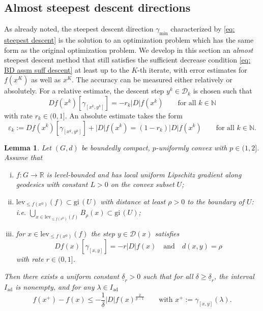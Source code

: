 \documentclass{article}
\theoremstyle{plain}\newtheorem{theorem}{Theorem}[section]
\theoremstyle{plain}\newtheorem{definition}[theorem]{Definition}
\theoremstyle{plain}\newtheorem{lemma}[theorem]{Lemma}
\theoremstyle{definition}\newtheorem{remark}[theorem]{Remark}
\theoremstyle{definition}\newtheorem{example}[theorem]{Example}
\theoremstyle{plain}\newtheorem{proposition}[theorem]{Proposition}
\theoremstyle{plain}\newtheorem{inference}[theorem]{Inference}
\theoremstyle{plain}\newtheorem{corollary}[theorem]{Corollary}
\theoremstyle{plain}\newtheorem{assumption}[theorem]{Assumption}
\newcommand{\bbN}{\mathbb{N}}
\begin{document}
\subsection{Almost steepest descent directions}\label{s:inexact}
As already noted, the steepest descent direction $\gamma_{\min}$ characterized by \eqref{eq: steepest descent} is the solution to an optimization problem which has the same form as the original optimization problem. We develop in this section an {\em almost} steepest descent method that still satisfies the sufficient decrease condition \eqref{eq: BD assm suff descent} at least up to the $K$-th iterate, with error estimates for $f(x^K)$ as well as $x^K$. The accuracy can be measured either relatively or absolutely.  For a relative estimate, the descent step $y^k\in\mathcal{D}_k$ is chosen such that
\begin{equation}\label{eq: rel error}
    Df(x^k)[\gamma_{[x^k,y^k]}]=-r_k|D|f(x^k) \qquad\text{for all}\,\,k\in\bbN
\end{equation}
with rate $r_k\in(0,1]$. An absolute estimate takes the form
\begin{equation}\label{eq: abs error}
    \varepsilon_k:=Df(x^k)[\gamma_{[x^k,y^k]}]+|D|f(x^k)=(1-r_k)|D|f(x^k) \qquad\text{for all}\,\,k\in\bbN.
\end{equation}
\begin{lemma}\label{lm: ID method 1}
    Let $(G,d)$ be boundedly compact, $p$-uniformly convex with $p\in(1,2]$. Assume that
    \begin{enumerate}[(i)]
        \item $f:G\to\mathbb{R}$ is level-bounded and has local uniform Lipschitz gradient along geodesics with constant $L>0$ on the convex subset $U$;
        \item $\mathrm{lev}_{\leq f(x^0)}(f)\subset \mathrm{gi}\,(U)$ with distance at least $\rho>0$ to the boundary of $U$: i.e. $\bigcup_{x\in \mathrm{lev}_{\leq f(x^0)}(f)} B_\rho(x)\subset \mathrm{gi}\,(U)$;
        \item for $x\in\mathrm{lev}_{\leq f(x^0)}(f)$ the step $y\in\mathcal{D}(x)$ satisfies
        \begin{equation}\label{eq: ID method y^k}
            Df(x)[\gamma_{[x,y]}]=-r|D|f(x)\quad\text{and}\quad d(x,y)=\rho
        \end{equation}
        with rate $r\in(0,1]$.
    \end{enumerate}
    Then there exists a uniform constant $\underline{\delta}_r>0$ such that for all $\delta\geq\underline{\delta}_r$, the interval $I_{\mathrm{ad}}$ is nonempty, and for any $\lambda\in I_{\mathrm{ad}}$
    $$
    f(x^+)-f(x)\leq-\frac{1}{\delta}|D|f(x)^{\frac{2}{p-1}} \qquad \text{with}\,\,x^+:=\gamma_{[x,y]}(\lambda).
    $$
\end{lemma}
\end{document}
